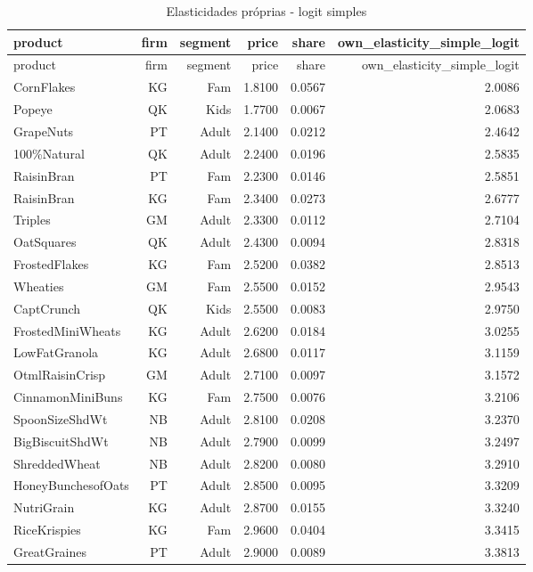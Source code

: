 \begingroup
\scriptsize
\begin{longtable}{@{}lrrrrr@{}}
\caption{Elasticidades próprias - logit simples}\label{tab:own-elas-simple}\\
\toprule
product & firm & segment & price & share & own\_elasticity\_simple\_logit \\
\midrule
\endfirsthead
\toprule
product & firm & segment & price & share & own\_elasticity\_simple\_logit \\
\midrule
\endhead
CornFlakes & KG & Fam & 1.8100 & 0.0567 & 2.0086 \\
Popeye & QK & Kids & 1.7700 & 0.0067 & 2.0683 \\
GrapeNuts & PT & Adult & 2.1400 & 0.0212 & 2.4642 \\
100\%Natural & QK & Adult & 2.2400 & 0.0196 & 2.5835 \\
RaisinBran & PT & Fam & 2.2300 & 0.0146 & 2.5851 \\
RaisinBran & KG & Fam & 2.3400 & 0.0273 & 2.6777 \\
Triples & GM & Adult & 2.3300 & 0.0112 & 2.7104 \\
OatSquares & QK & Adult & 2.4300 & 0.0094 & 2.8318 \\
FrostedFlakes & KG & Fam & 2.5200 & 0.0382 & 2.8513 \\
Wheaties & GM & Fam & 2.5500 & 0.0152 & 2.9543 \\
CaptCrunch & QK & Kids & 2.5500 & 0.0083 & 2.9750 \\
FrostedMiniWheats & KG & Adult & 2.6200 & 0.0184 & 3.0255 \\
LowFatGranola & KG & Adult & 2.6800 & 0.0117 & 3.1159 \\
OtmlRaisinCrisp & GM & Adult & 2.7100 & 0.0097 & 3.1572 \\
CinnamonMiniBuns & KG & Fam & 2.7500 & 0.0076 & 3.2106 \\
SpoonSizeShdWt & NB & Adult & 2.8100 & 0.0208 & 3.2370 \\
BigBiscuitShdWt & NB & Adult & 2.7900 & 0.0099 & 3.2497 \\
ShreddedWheat & NB & Adult & 2.8200 & 0.0080 & 3.2910 \\
HoneyBunchesofOats & PT & Adult & 2.8500 & 0.0095 & 3.3209 \\
NutriGrain & KG & Adult & 2.8700 & 0.0155 & 3.3240 \\
RiceKrispies & KG & Fam & 2.9600 & 0.0404 & 3.3415 \\
GreatGraines & PT & Adult & 2.9000 & 0.0089 & 3.3813 \\

\end{longtable}
